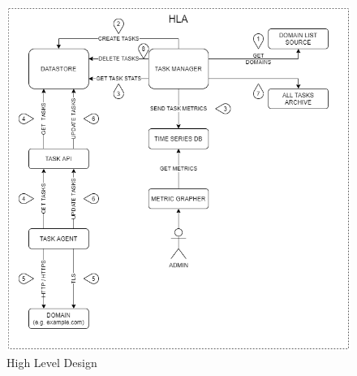 \documentclass{mscreport}
\begin{document}
\begin{figure}[p]
	\begin{center}
		\includegraphics[scale=0.5]{../images/HLA_Pre_Implementation_v2.png} 
		\caption{High Level Design}
		\label{fig:hla_design}
	\end{center}
\end{figure}
\end{document}
